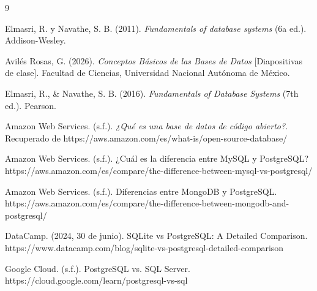 \renewcommand{\refname}{\section{Referencias}}
\begin{thebibliography}{9}

Elmasri, R. y Navathe, S. B. (2011). \textit{Fundamentals of database systems} (6a ed.). Addison-Wesley.

Avilés Rosas, G. (2026). \textit{Conceptos Básicos de las Bases de Datos} [Diapositivas de clase]. Facultad de Ciencias, Universidad Nacional Autónoma de México.
    
Elmasri, R., \& Navathe, S. B. (2016). \textit{Fundamentals of Database Systems} (7th ed.). Pearson.

  Amazon Web Services. (s.f.). \textit{¿Qué es una base de datos de código abierto?}. Recuperado de https://aws.amazon.com/es/what-is/open-source-database/
  
Amazon Web Services. (s.f.). ¿Cuál es la diferencia entre MySQL y PostgreSQL? https://aws.amazon.com/es/compare/the-difference-between-mysql-vs-postgresql/

Amazon Web Services. (s.f.). Diferencias entre MongoDB y PostgreSQL. https://aws.amazon.com/es/compare/the-difference-between-mongodb-and-postgresql/

DataCamp. (2024, 30 de junio). SQLite vs PostgreSQL: A Detailed Comparison. https://www.datacamp.com/blog/sqlite-vs-postgresql-detailed-comparison

Google Cloud. (s.f.). PostgreSQL vs. SQL Server. https://cloud.google.com/learn/postgresql-vs-sql
\end{thebibliography}

